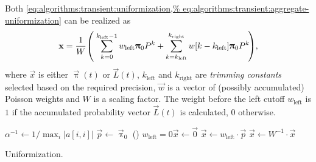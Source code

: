 Both \vref{eq:algorithms:transient:uniformization,%
eq:algorithms:transient:aggregate-uniformization} can be realized
as
\begin{equation}
  \vec{x} = \frac{1}{W} \mleft(\; \sum_{k = 0}^{k_{\text{left}} - 1} w_{\text{left}}
  \vec{\uppi}_0 P^k + \sum_{k = k_{\text{left}}}^{k_{\text{right}}}
  w[k - k_{\text{left}}] \vec{\uppi}_0 P^k \!\mright) \text,
  \label{eq:algorithms:transient:uniformization-impl}
\end{equation}
where $\vec{x}$ is either $\vec{\uppi}(t)$ or $\vec{L}(t)$,
$k_{\text{left}}$ and $k_{\text{right}}$ are \emph{trimming constants}
selected based on the required precision, $\vec{w}$ is a vector of
(possibly accumulated) Poisson weights and $W$ is a scaling
factor. The weight before the left cutoff $w_{\text{left}}$ is $1$ if
the accumulated probability vector $\vec{L}(t)$ is calculated, $0$
otherwise.

\begin{algorithm}
  \;
  $\alpha^{-1} \gets 1 / \max_{i} \lvert a[i,i] \rvert$
  \label{ln:algorithms:transient:uniformization:alpha}\;
  $\vec{p} \gets \vec{\uppi}_0$\;
  \leIf()
  {$w_{\text{left}} = 0$}{$\vec{x} \gets \vec{0}$}
  {$\vec{x} \gets w_{\text{left}} \cdot \vec{p}$}
  $\vec{x} \gets W^{-1} \cdot \vec{x}$
  \;
  \caption{Uniformization.}
  \label{alg:algorithms:transient:uniformization}
\end{algorithm}

